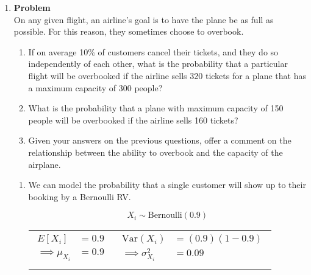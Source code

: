 \documentclass[12pt]{article}
\newenvironment{Ex}{\textbf{Problem}\vspace{.75em}\\}{}
\begin{document}
\begin{enumerate}
\item
  \begin{Ex}
    On any given flight, an airline’s goal is to have the plane be as
    full as possible. For this reason, they sometimes choose to
    overbook.
    \begin{enumerate}
    \item If on average 10\% of customers cancel their tickets, and
      they do so independently of each other, what is the probability
      that a particular flight will be overbooked if the airline sells
      320 tickets for a plane that has a maximum capacity of 300
      people?
    \item What is the probability that a plane with maximum capacity
      of 150 people will be overbooked if the airline sells 160
      tickets?
    \item Given your answers on the previous questions, offer a
      comment on the relationship between the ability to overbook and
      the capacity of the airplane.
    \end{enumerate}
    \begin{solution} \hfill
      \begin{enumerate}
      \item
        We can model the probability that a single customer will show
        up to their booking by a Bernoulli RV.
        \begin{table}[H]
          \begin{equation}
            \label{eq:2a-rv}
            X_i\sim\text{Bernoulli}(0.9)
          \end{equation}
          \begin{tabularx}{\linewidth}{XX}
            \begin{equation}
              \label{eq:2a-mean}
              \begin{aligned}
                E[X_i] &= 0.9 \\
                \implies \mu_{X_i} &= 0.9 \\
              \end{aligned}
            \end{equation}
            &
            \begin{equation}
              \label{eq:2a-var}
              \begin{aligned}
                \text{Var}(X_i) &= (0.9)(1-0.9) \\
                \implies \sigma_{X_i}^2 &= 0.09 \\
              \end{aligned}

\end{equation}
\end{tabularx}
\end{table}
\end{enumerate}
\end{solution}
\end{Ex}
\end{enumerate}
\end{document}
